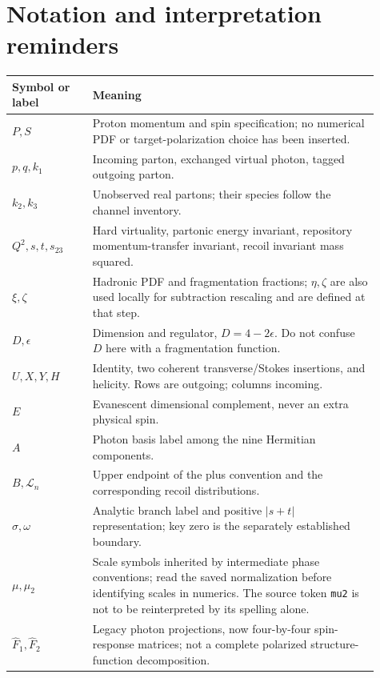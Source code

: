 \documentclass[11pt,a4paper]{article}
\newcommand{\eps}{\epsilon}
\newcommand{\code}[1]{{\small\nolinkurl{#1}}}
\begin{document}
\section{Notation and interpretation reminders}
\begin{longtable}{p{0.20\linewidth}p{0.71\linewidth}}
\toprule Symbol or label & Meaning\\\midrule\endhead
$P,S$ & Proton momentum and spin specification; no numerical PDF or target-polarization choice has been inserted.\\
$p,q,k_1$ & Incoming parton, exchanged virtual photon, tagged outgoing parton.\\
$k_2,k_3$ & Unobserved real partons; their species follow the channel inventory.\\
$Q^2,s,t,s_{23}$ & Hard virtuality, partonic energy invariant, repository momentum-transfer invariant, recoil invariant mass squared.\\
$\xi,\zeta$ & Hadronic PDF and fragmentation fractions; $\eta,\zeta$ are also used locally for subtraction rescaling and are defined at that step.\\
$D,\eps$ & Dimension and regulator, $D=4-2\eps$. Do not confuse $D$ here with a fragmentation function.\\
$U,X,Y,H$ & Identity, two coherent transverse/Stokes insertions, and helicity. Rows are outgoing; columns incoming.\\
$E$ & Evanescent dimensional complement, never an extra physical spin.\\
$A$ & Photon basis label among the nine Hermitian components.\\
$B,\mathcal L_n$ & Upper endpoint of the plus convention and the corresponding recoil distributions.\\
$\sigma,\omega$ & Analytic branch label and positive $|s+t|$ representation; key zero is the separately established boundary.\\
$\mu,\mu_2$ & Scale symbols inherited by intermediate phase conventions; read the saved normalization before identifying scales in numerics. The source token \code{mu2} is not to be reinterpreted by its spelling alone.\\
$\widehat F_1,\widehat F_2$ & Legacy photon projections, now four-by-four spin-response matrices; not a complete polarized structure-function decomposition.\\
\bottomrule
\end{longtable}
\end{document}
